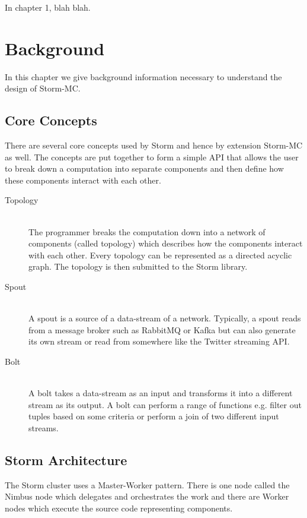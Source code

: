 \documentclass[bsc,logo,frontabs,twoside,singlespacing,normalheadings,parskip]{infthesis}     %
\begin{document}
In chapter 1, blah blah.




\chapter{Background}

In this chapter we give background information necessary to understand the design of Storm-MC.

\section{Core Concepts}

There are several core concepts used by Storm and hence by extension Storm-MC as well. The concepts are put together to form a simple API that allows the user to break down a computation into separate components and then define how these components interact with each other.

\begin{description}
  \item[Topology] \hfill \\
  The programmer breaks the computation down into a network of components (called topology) which describes how the components interact with each other. Every topology can be represented as a directed acyclic graph. The topology is then submitted to the Storm library.
  \item[Spout] \hfill \\
  A spout is a source of a data-stream of a network. Typically, a spout reads from a message broker such as RabbitMQ or Kafka but can also generate its own stream or read from somewhere like the Twitter streaming API.
  \item[Bolt] \hfill \\
  A bolt takes a data-stream as an input and transforms it into a different stream as its output. A bolt can perform a range of functions e.g. filter out tuples based on some criteria or perform a join of two different input streams.
\end{description}

\section{Storm Architecture}

The Storm cluster uses a Master-Worker pattern. There is one node called the Nimbus node which delegates and orchestrates the work and there are Worker nodes which execute the source code representing components.
\end{document}
